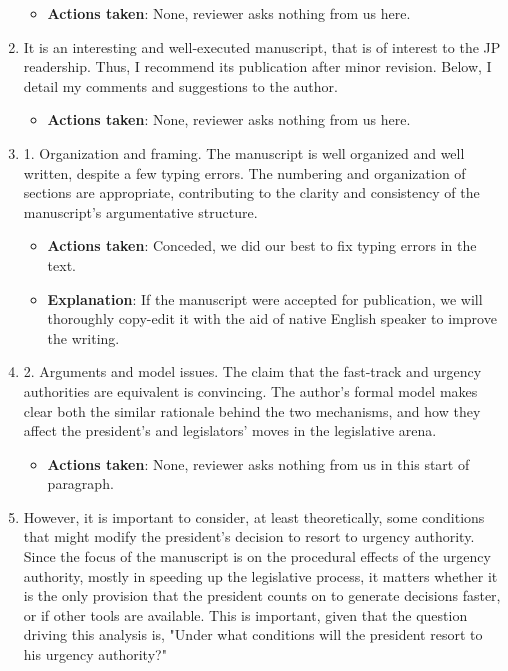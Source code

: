 \documentclass[article,letterpaper,times,12pt,listings-bw,microtype]{article}
\begin{document}
\begin{enumerate}
\label{sec:orgb1504c6}
\begin{itemize}
\item \textbf{Actions taken}: None, reviewer asks nothing from us here.
\end{itemize}
\item It is an interesting and well‐executed manuscript, that is of interest to the JP readership. Thus, I recommend its publication after minor revision. Below, I detail my comments and suggestions to the author.
\label{sec:org4e12a76}
\begin{itemize}
\item \textbf{Actions taken}: None, reviewer asks nothing from us here.
\end{itemize}
\item 1.    Organization and framing. The manuscript is well organized and well written, despite a few typing errors. The numbering and organization of sections are appropriate, contributing to the clarity and consistency of the manuscript's argumentative structure.
\label{sec:org756ff24}
\begin{itemize}
\item \textbf{Actions taken}: Conceded, we did our best to fix typing errors in the text.
\item \textbf{Explanation}: If the manuscript were accepted for publication, we will thoroughly copy-edit it with the aid of native English speaker to improve the writing.
\end{itemize}
\item 2. Arguments and model issues. The claim that the fast-track and urgency authorities are equivalent is convincing. The author's formal model makes clear both the similar rationale behind the two mechanisms, and how they affect the president's and legislators' moves in the legislative arena.
\label{sec:org8b65dd3}
\begin{itemize}
\item \textbf{Actions taken}: None, reviewer asks nothing from us in this start of paragraph.
\end{itemize}
\item However, it is important to consider, at least theoretically, some conditions that might modify the president's decision to resort to urgency authority. Since the focus of the manuscript is on the procedural effects of the urgency authority, mostly in speeding up the legislative process, it matters whether it is the only provision that the president counts on to generate decisions faster, or if other tools are available. This is important, given that the question driving this analysis is, "Under what conditions will the president resort to his urgency authority?"

\end{enumerate}
\end{document}
